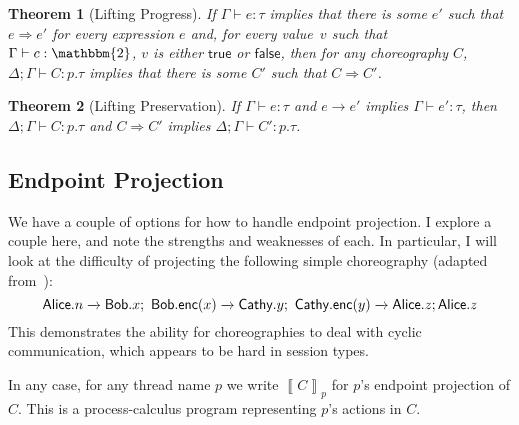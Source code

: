 \documentclass{article}
\newtheorem{thm}{Theorem}
\theoremstyle{definition}
\newcommand{\bool}{\mathbbm{2}}
\newcommand{\ett}{\textsf{true}}
\newcommand{\eff}{\textsf{false}}
\newcommand{\To}{\Rightarrow}
\newcommand{\own}[2]{#1.#2}
\newcommand{\send}[3][]{#2\nolinebreak \mathrel{\xrightarrow{#1}}\nolinebreak #3}
\newcommand{\proves}{\vdash}
\newcommand{\transb}[1]{\left\llbracket #1 \right\rrbracket}
\begin{document}
\begin{thm}[Lifting Progress]
  \label{thm:lifting-progress}
  If $\Gamma \proves e : \tau$ implies that there is some $e'$ such that $e \To e'$ for every expression $e$ and, for every value~$v$ such that $\Gamma \proves c : \bool$, $v$ is either $\ett$ or $\eff$, then for any choreography $C$, $\Delta; \Gamma \proves C : p.\tau$ implies that there is some $C'$ such that $C \To C'$.
\end{thm}

\begin{thm}[Lifting Preservation]
  \label{thm:lifting-preservation}
  If $\Gamma \proves e : \tau$ and $e \to e'$ implies $\Gamma \proves e' : \tau$, then $\Delta; \Gamma \proves C : p.\tau$ and $C \To C'$ implies $\Delta; \Gamma \proves C' : p.\tau$.
\end{thm}


\subsection{Endpoint Projection}

We have a couple of options for how to handle endpoint projection.
I explore a couple here, and note the strengths and weaknesses of each.
In particular, I will look at the difficulty of projecting the following simple choreography (adapted from~\citet{AschieriG20}):
$$\send{\own{\textsf{Alice}}{n}}{\own{\textsf{Bob}}{x}};~\send{\own{\textsf{Bob}}{\textsf{enc}(x)}}{\own{\textsf{Cathy}}{y}};~\send{\own{\textsf{Cathy}}{\textsf{enc}(y)}}{\own{\textsf{Alice}}{z}}; \own{\textsf{Alice}}{z}$$
This demonstrates the ability for choreographies to deal with cyclic communication, which appears to be hard in session types.

In any case, for any thread name $p$ we write $\transb{C}_p$ for $p$'s endpoint projection of $C$.
This is a process-calculus program representing $p$'s actions in $C$.
\end{document}
